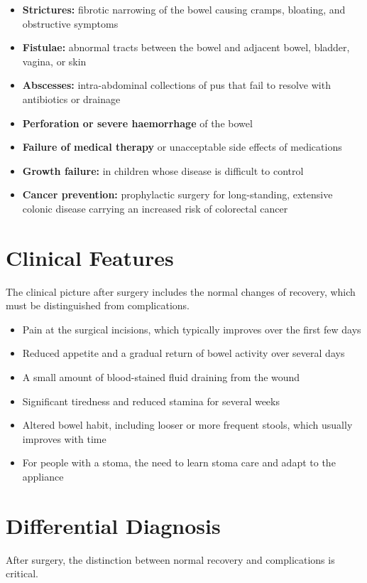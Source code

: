 \begin{itemize}
    \item \textbf{Strictures:} fibrotic narrowing of the bowel causing cramps, bloating, and obstructive symptoms
    \item \textbf{Fistulae:} abnormal tracts between the bowel and adjacent bowel, bladder, vagina, or skin
    \item \textbf{Abscesses:} intra-abdominal collections of pus that fail to resolve with antibiotics or drainage
    \item \textbf{Perforation or severe haemorrhage} of the bowel
    \item \textbf{Failure of medical therapy} or unacceptable side effects of medications
    \item \textbf{Growth failure:} in children whose disease is difficult to control
    \item \textbf{Cancer prevention:} prophylactic surgery for long-standing, extensive colonic disease carrying an increased risk of colorectal cancer
\end{itemize}

\section*{Clinical Features}
The clinical picture after surgery includes the normal changes of recovery, which must be distinguished from complications.

\begin{itemize}
    \item Pain at the surgical incisions, which typically improves over the first few days
    \item Reduced appetite and a gradual return of bowel activity over several days
    \item A small amount of blood-stained fluid draining from the wound
    \item Significant tiredness and reduced stamina for several weeks
    \item Altered bowel habit, including looser or more frequent stools, which usually improves with time
    \item For people with a stoma, the need to learn stoma care and adapt to the appliance
\end{itemize}

\section*{Differential Diagnosis}
After surgery, the distinction between normal recovery and complications is critical.

